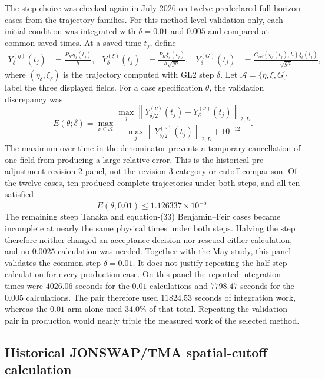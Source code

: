 \documentclass[11pt]{article}
\newcommand{\norm}[1]{\left\lVert #1\right\rVert}
\begin{document}
The step choice was checked again in July 2026 on twelve predeclared
full-horizon cases from the trajectory families.  For this method-level
validation only, each initial condition was integrated with
$\delta=0.01$ and $0.005$ and compared at common saved times.  At a saved
time $t_j$, define
\begin{align}
  Y_\delta^{(\eta)}(t_j)&=\frac{P_K\eta_\delta(t_j)}{h},&
  Y_\delta^{(\xi)}(t_j)&=\frac{P_K\xi_\delta(t_j)}{h\sqrt{gh}},&
  Y_\delta^{(G)}(t_j)&=
    \frac{G_{\mathrm{ref}}(\eta_\delta(t_j);h)\xi_\delta(t_j)}
         {\sqrt{gh}},
  \label{eq:dimensionless-delivered-fields}
\end{align}
where $(\eta_\delta,\xi_\delta)$ is the trajectory computed with GL2 step
$\delta$.  Let $\mathcal A=\{\eta,\xi,G\}$ label the three displayed fields.
For a case specification $\theta$, the validation discrepancy was
\begin{equation}
  E(\theta;\delta)
  =
  \max_{\nu\in\mathcal A}
  \frac{
    \max_j\norm{Y_{\delta/2}^{(\nu)}(t_j)
                    -Y_\delta^{(\nu)}(t_j)}_{2,L}
  }{
    \max_j\norm{Y_{\delta/2}^{(\nu)}(t_j)}_{2,L}+10^{-12}
  }.
  \label{eq:method-refinement-error}
\end{equation}
The maximum over time in the denominator prevents a temporary cancellation
of one field from producing a large relative error.  This is the historical
pre-adjustment revision-2 panel, not the revision-3 category or cutoff
comparison.  Of the twelve cases,
ten produced complete trajectories under both steps, and all ten satisfied
\[
  E(\theta;0.01)\leq1.126337\times10^{-5}.
\]
The remaining steep Tanaka and equation-(33) Benjamin--Feir cases became
incomplete at nearly the same physical times under both steps.  Halving the
step therefore neither changed an acceptance decision nor rescued either
calculation, and no $0.0025$ calculation was needed.  Together with the May
study, this panel validates the common step $\delta=0.01$.  It does not
justify repeating the half-step calculation for every production case.
On this panel the reported integration times were $4026.06$ seconds for the
$0.01$ calculations and $7798.47$ seconds for the $0.005$ calculations.  The
pair therefore used $11824.53$ seconds of integration work, whereas the
$0.01$ arm alone used $34.0\%$ of that total.  Repeating the validation pair
in production would nearly triple the measured work of the selected method.

\subsection{Historical JONSWAP/TMA spatial-cutoff calculation}
\end{document}
